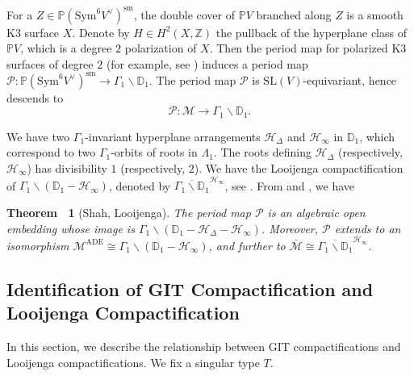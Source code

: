 \documentclass[12pt,reqno,a4paper]{amsart}
\newtheorem{thm}{Theorem~}[section]
\theoremstyle{remark}
\theoremstyle{definition}
\newcommand{\ZZ}{\mathbb{Z}}
\newcommand{\PP}{\mathbb{P}}
\newcommand{\DD}{\mathbb{D}}
\newcommand{\Prd}{\mathscr{P}}
\newcommand{\calH}{\mathcal{H}}
\newcommand{\calM}{\mathcal{M}}
\newcommand\Sym{\mathrm{Sym}}
\newcommand\SL{\mathrm{SL}}
\newcommand{\bs}{\backslash}
\begin{document}
For a $Z\in \PP(\Sym^6 V^\vee)^{\mathrm{sm}}$, the double cover of $\PP V$ branched along $Z$ is a smooth K3 surface $X$.
Denote by $H\in H^2(X,\ZZ)$ the pullback of the hyperplane class of $\PP V$, which is a degree $2$ polarization of $X$.
Then the period map for polarized K3 surfaces of degree $2$ (for example, see \cite[Chapter 6, \S 4.1]{huybrechts2016lectures}) induces a period map $\Prd\colon \PP(\Sym^6 V^\vee)^{\mathrm{sm}}\to \Gamma_1\bs\DD_1$.
The period map $\Prd$ is $\SL(V)$-equivariant, hence descends to 
\begin{equation*}
    \Prd\colon \calM\to \Gamma_1\bs\DD_1.
\end{equation*}

We have two $\Gamma_1$-invariant hyperplane arrangements $\calH_\Delta$ and $\calH_\infty$ in $\DD_1$, which correspond to two $\Gamma_1$-orbits of roots in $\Lambda_1$.
The roots defining $\calH_\Delta$ (respectively, $\calH_\infty$) has divisibility $1$ (respectively, $2$).
We have the Looijenga compactification of $\Gamma_1\bs(\DD_1-\calH_\infty)$, denoted by $\overline{\Gamma_1\bs\DD_1}^{\calH_\infty}$, see \cite{looijenga2003compactificationsII}.
From \cite{shah1980complete} and \cite{looijenga2003compactificationsII}, we have
\begin{thm}[Shah, Looijenga]
\label{thm: Shah--Looijenga}
    The period map $\Prd$ is an algebraic open embedding whose image is $\Gamma_1\bs(\DD_1-\calH_\Delta-\calH_\infty)$.
    Moreover, $\Prd$ extends to an isomorphism $\calM^{\mathrm{ADE}}\cong\Gamma_1\bs(\DD_1-\calH_\infty)$, and further to $\overline{\calM}\cong\overline{\Gamma_1\bs\DD_1}^{\calH_\infty}$.
\end{thm}


\subsection{Identification of GIT Compactification and Looijenga Compactification}
\label{subsec: identification of compactifications}

In this section, we describe the relationship between GIT compactifications and Looijenga compactifications.
We fix a singular type $T$.

\end{document}

